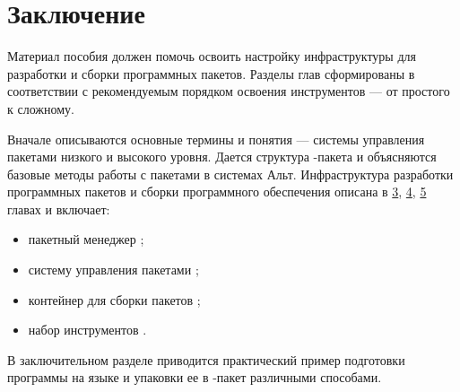 \chapter*{Заключение}
Материал пособия должен помочь освоить настройку инфраструктуры для разработки и сборки программных пакетов. Разделы глав сформированы в соответствии с рекомендуемым порядком освоения инструментов --- от простого к сложному. 

Вначале описываются основные термины и понятия --- системы управления пакетами низкого и высокого уровня. Дается структура -пакета и объясняются базовые методы работы с пакетами в системах Альт. Инфраструктура разработки программных пакетов и сборки программного обеспечения описана в \hyperlink{3}{3}, \hyperlink{4}{4}, \hyperlink{5}{5} главах и включает: 
\begin{itemize}
	\item пакетный менеджер ;
	\item систему управления пакетами ;
	\item контейнер для сборки пакетов ;
	\item набор инструментов . 
\end{itemize}

В заключительном разделе приводится практический пример подготовки программы на языке  и упаковки ее в -пакет различными способами. 